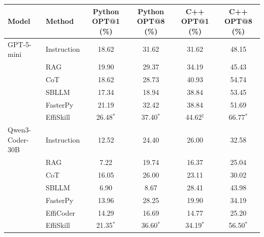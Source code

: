 \begin{tabular}{llcccc}
\toprule
Model & Method & Python OPT@1 (\%) & Python OPT@8 (\%) & C++ OPT@1 (\%) & C++ OPT@8 (\%) \\
\midrule
GPT-5-mini & Instruction & 18.62 & 31.62 & 31.62 & 48.15 \\
 & RAG & 19.90 & 29.37 & 34.19 & 45.43 \\
 & CoT & 18.62 & 28.73 & 40.93 & 54.74 \\
 & SBLLM & 17.34 & 18.94 & 38.84 & 53.45 \\
 & FasterPy & 21.19 & 32.42 & 38.84 & 51.69 \\
 & EffiSkill & 26.48$^{*}$ & 37.40$^{*}$ & 44.62$^{\dagger}$ & 66.77$^{*}$ \\
\midrule
Qwen3-Coder-30B & Instruction & 12.52 & 24.40 & 26.00 & 32.58 \\
 & RAG & 7.22 & 19.74 & 16.37 & 25.04 \\
 & CoT & 16.05 & 26.00 & 23.11 & 30.02 \\
 & SBLLM & 6.90 & 8.67 & 28.41 & 43.98 \\
 & FasterPy & 13.96 & 28.25 & 19.90 & 34.19 \\
 & EffiCoder & 14.29 & 16.69 & 14.77 & 25.20 \\
 & EffiSkill & 21.35$^{*}$ & 36.60$^{*}$ & 34.19$^{*}$ & 56.50$^{*}$ \\
\bottomrule
\end{tabular}

